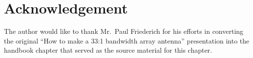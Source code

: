 \section{Acknowledgement}
The author would like to thank Mr.\ Paul Friederich for his efforts in converting the original ``How to make a 33:1 bandwidth array antenna'' presentation into the handbook chapter \cite{BalanisHB12} that served as the source material for this chapter.

\FloatBarrier



